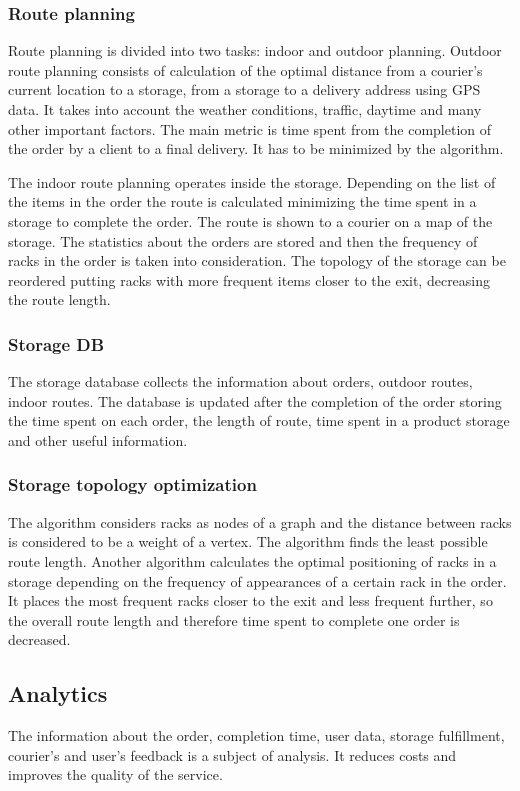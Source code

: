 \subsubsection{Route planning}

Route planning is divided into two tasks: indoor and outdoor planning. Outdoor route planning consists of calculation of the optimal distance from a courier’s current location to a storage, from a storage to a delivery address using GPS data. It takes into account the weather conditions, traffic, daytime and many other important factors. The main metric is time spent from the completion of the order by a client to a final delivery. It has to be minimized by the algorithm.

The indoor route planning operates inside the storage. Depending on the list of the items in the order the route is calculated minimizing the time spent in a storage to complete the order. The route is shown to a courier on a map of the storage. The statistics about the orders are stored and then the frequency of racks in the order is taken into consideration. The topology of the storage can be reordered putting racks with more frequent items closer to the exit, decreasing the route length.

\subsubsection{Storage DB}

The storage database collects the information about orders, outdoor routes, indoor routes. The database is updated after the completion of the order storing the time spent on each order, the length of route, time spent in a product storage and other useful information.

\subsubsection{Storage topology optimization}

The algorithm considers racks as nodes of a graph and the distance between racks is considered to be a weight of a vertex. The algorithm finds the least possible route length. Another algorithm calculates the optimal positioning of racks in a storage depending on the frequency of appearances of a certain rack in the order. It places the most frequent racks closer to the exit and less frequent further, so the overall route length and therefore time spent to complete one order is decreased.

\subsection{Analytics}

The information about the order, completion time, user data, storage fulfillment, courier’s and user’s feedback is a subject of analysis. It reduces costs and improves the quality of the service.
